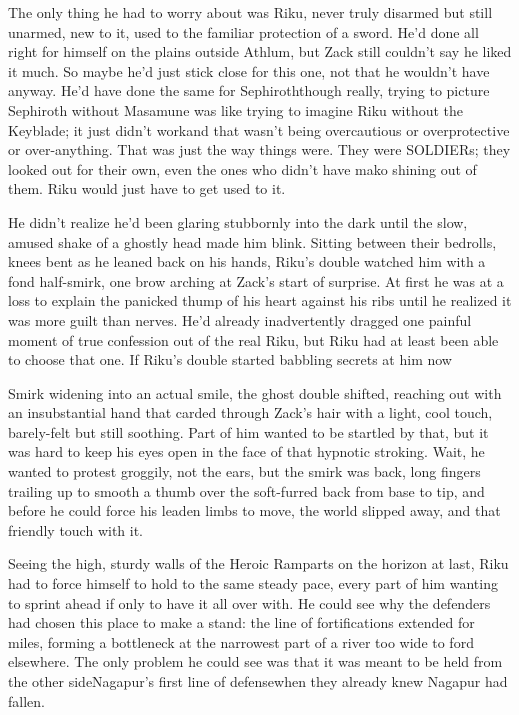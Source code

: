 The only thing he had to worry about was Riku, never truly disarmed but still unarmed, new to it, used to the familiar protection of a sword. He'd done all right for himself on the plains outside Athlum, but Zack still couldn't say he liked it much. So maybe he'd just stick close for this one, not that he wouldn't have anyway. He'd have done the same for Sephiroth\textemdash though really, trying to picture Sephiroth without Masamune was like trying to imagine Riku without the Keyblade; it just didn't work\textemdash and that wasn't being overcautious or overprotective or over-anything. That was just the way things were. They were SOLDIERs; they looked out for their own, even the ones who didn't have mako shining out of them. Riku would just have to get used to it.

He didn't realize he'd been glaring stubbornly into the dark until the slow, amused shake of a ghostly head made him blink. Sitting between their bedrolls, knees bent as he leaned back on his hands, Riku's double watched him with a fond half-smirk, one brow arching at Zack's start of surprise. At first he was at a loss to explain the panicked thump of his heart against his ribs until he realized it was more guilt than nerves. He'd already inadvertently dragged one painful moment of true confession out of the real Riku, but Riku had at least been able to choose that one. If Riku's double started babbling secrets at him now\textemdash 

Smirk widening into an actual smile, the ghost double shifted, reaching out with an insubstantial hand that carded through Zack's hair with a light, cool touch, barely-felt but still soothing. Part of him wanted to be startled by that, but it was hard to keep his eyes open in the face of that hypnotic stroking. Wait, he wanted to protest groggily, not the ears, but the smirk was back, long fingers trailing up to smooth a thumb over the soft-furred back from base to tip, and before he could force his leaden limbs to move, the world slipped away, and that friendly touch with it.


\scenechange


Seeing the high, sturdy walls of the Heroic Ramparts on the horizon at last, Riku had to force himself to hold to the same steady pace, every part of him wanting to sprint ahead if only to have it all over with. He could see why the defenders had chosen this place to make a stand: the line of fortifications extended for miles, forming a bottleneck at the narrowest part of a river too wide to ford elsewhere. The only problem he could see was that it was meant to be held from the other side\textemdash Nagapur's first line of defense\textemdash when they already knew Nagapur had fallen.

